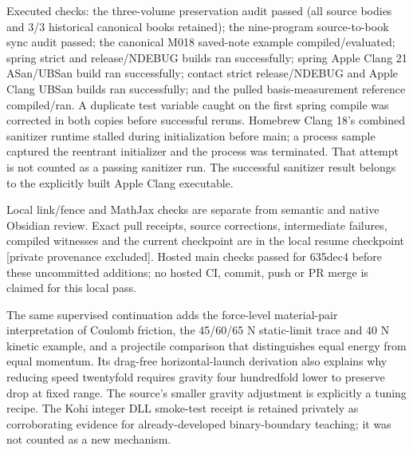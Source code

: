 Executed checks: the three-volume preservation audit passed (all source bodies and 3/3 historical canonical books retained); the nine-program source-to-book sync audit passed; the canonical M018 saved-note example compiled/evaluated; spring strict and release/NDEBUG builds ran successfully; spring Apple Clang 21 ASan/UBSan build ran successfully; contact strict release/NDEBUG and Apple Clang UBSan builds ran successfully; and the pulled basis-measurement reference compiled/ran. A duplicate test variable caught on the first spring compile was corrected in both copies before successful reruns. Homebrew Clang 18's combined sanitizer runtime stalled during initialization before main; a process sample captured the reentrant initializer and the process was terminated. That attempt is not counted as a passing sanitizer run. The successful sanitizer result belongs to the explicitly built Apple Clang executable.

Local link/fence and MathJax checks are separate from semantic and native Obsidian review. Exact pull receipts, source corrections, intermediate failures, compiled witnesses and the current checkpoint are in the local {resume checkpoint {[}private provenance excluded{]}}. Hosted main checks passed for 635dec4 before these uncommitted additions; no hosted CI, commit, push or PR merge is claimed for this local pass.

The same supervised continuation adds the force-level material-pair interpretation of Coulomb friction, the 45/60/65 N static-limit trace and 40 N kinetic example, and a projectile comparison that distinguishes equal energy from equal momentum. Its drag-free horizontal-launch derivation also explains why reducing speed twentyfold requires gravity four hundredfold lower to preserve drop at fixed range. The source's smaller gravity adjustment is explicitly a tuning recipe. The Kohi integer DLL smoke-test receipt is retained privately as corroborating evidence for already-developed binary-boundary teaching; it was not counted as a new mechanism.
